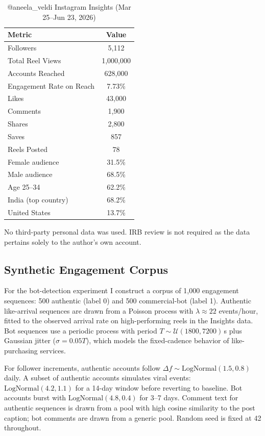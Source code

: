 \documentclass[conference]{IEEEtran}
\begin{document}
\begin{table}[t]
\caption{@aneela\_veldi Instagram Insights (Mar 25--Jun 23, 2026)}
\label{tab:insights}
\centering
\begin{tabular}{lc}
\toprule
\textbf{Metric} & \textbf{Value} \\
\midrule
Followers & 5{,}112 \\
Total Reel Views & 1{,}000{,}000 \\
Accounts Reached & 628{,}000 \\
Engagement Rate on Reach & 7.73\% \\
Likes & 43{,}000 \\
Comments & 1{,}900 \\
Shares & 2{,}800 \\
Saves & 857 \\
Reels Posted & 78 \\
\midrule
Female audience & 31.5\% \\
Male audience & 68.5\% \\
Age 25--34 & 62.2\% \\
India (top country) & 68.2\% \\
United States & 13.7\% \\
\bottomrule
\end{tabular}
\end{table}

No third-party personal data was used. IRB review is not required as the
data pertains solely to the author's own account.

\subsection{Synthetic Engagement Corpus}

For the bot-detection experiment I construct a corpus of 1{,}000 engagement
sequences: 500 authentic (label 0) and 500 commercial-bot (label 1).
Authentic like-arrival sequences are drawn from a Poisson process with
$\lambda \approx 22$ events/hour, fitted to the observed arrival rate on
high-performing reels in the Insights data. Bot sequences use a periodic
process with period $T \sim \mathcal{U}(1800, 7200)$\,s plus Gaussian jitter
($\sigma = 0.05T$), which models the fixed-cadence behavior of
like-purchasing services.

For follower increments, authentic accounts follow $\Delta f \sim
\text{LogNormal}(1.5, 0.8)$ daily. A subset of authentic accounts simulates
viral events: $\text{LogNormal}(4.2, 1.1)$ for a 14-day window before
reverting to baseline. Bot accounts burst with $\text{LogNormal}(4.8, 0.4)$
for 3--7 days. Comment text for authentic sequences is drawn from a pool
with high cosine similarity to the post caption; bot comments are drawn from
a generic pool. Random seed is fixed at 42 throughout.
\end{document}
